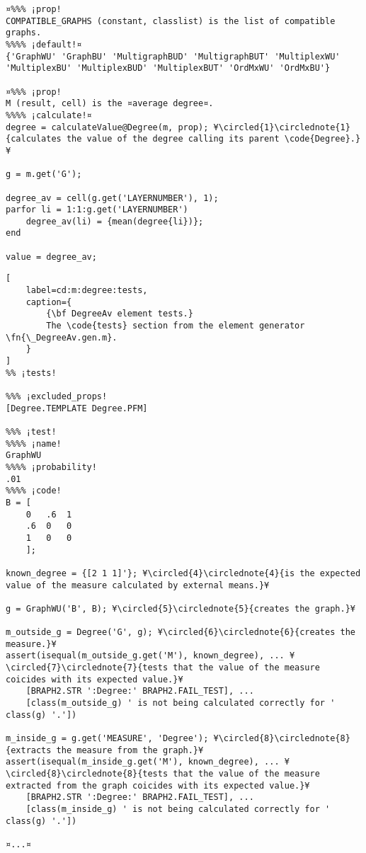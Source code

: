 \documentclass{tufte-handout}
\begin{document}
\begin{lstlisting}
¤%%% ¡prop!
COMPATIBLE_GRAPHS (constant, classlist) is the list of compatible graphs.
%%%% ¡default!¤
{'GraphWU' 'GraphBU' 'MultigraphBUD' 'MultigraphBUT' 'MultiplexWU' 'MultiplexBU' 'MultiplexBUD' 'MultiplexBUT' 'OrdMxWU' 'OrdMxBU'}

¤%%% ¡prop!
M (result, cell) is the ¤average degree¤.
%%%% ¡calculate!¤
degree = calculateValue@Degree(m, prop); ¥\circled{1}\circlednote{1}{calculates the value of the degree calling its parent \code{Degree}.}¥

g = m.get('G');

degree_av = cell(g.get('LAYERNUMBER'), 1);
parfor li = 1:1:g.get('LAYERNUMBER')
    degree_av(li) = {mean(degree{li})};
end

value = degree_av;
\end{lstlisting}

\begin{lstlisting}[
	label=cd:m:degree:tests,
	caption={
		{\bf DegreeAv element tests.}
		The \code{tests} section from the element generator \fn{\_DegreeAv.gen.m}.
	}
]
%% ¡tests!

%%% ¡excluded_props!
[Degree.TEMPLATE Degree.PFM] 

%%% ¡test!
%%%% ¡name!
GraphWU
%%%% ¡probability!
.01
%%%% ¡code!
B = [
    0   .6  1
    .6  0   0
    1   0   0
    ];

known_degree = {[2 1 1]'}; ¥\circled{4}\circlednote{4}{is the expected value of the measure calculated by external means.}¥

g = GraphWU('B', B); ¥\circled{5}\circlednote{5}{creates the graph.}¥

m_outside_g = Degree('G', g); ¥\circled{6}\circlednote{6}{creates the measure.}¥
assert(isequal(m_outside_g.get('M'), known_degree), ... ¥\circled{7}\circlednote{7}{tests that the value of the measure coicides with its expected value.}¥ 
    [BRAPH2.STR ':Degree:' BRAPH2.FAIL_TEST], ...
    [class(m_outside_g) ' is not being calculated correctly for ' class(g) '.'])

m_inside_g = g.get('MEASURE', 'Degree'); ¥\circled{8}\circlednote{8}{extracts the measure from the graph.}¥
assert(isequal(m_inside_g.get('M'), known_degree), ... ¥\circled{8}\circlednote{8}{tests that the value of the measure extracted from the graph coicides with its expected value.}¥
    [BRAPH2.STR ':Degree:' BRAPH2.FAIL_TEST], ...
    [class(m_inside_g) ' is not being calculated correctly for ' class(g) '.'])

¤...¤
\end{lstlisting}
\end{document}

